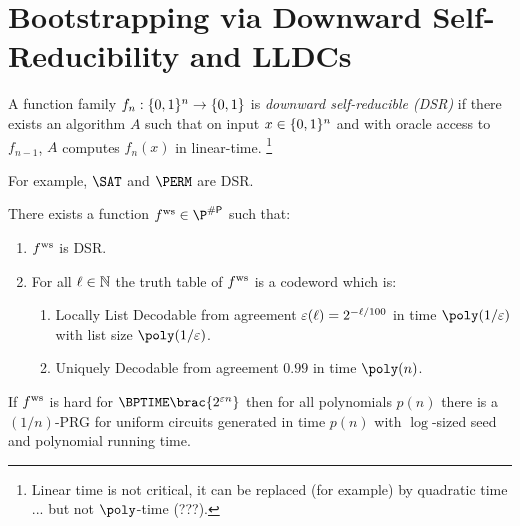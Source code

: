 \section{Bootstrapping via Downward Self-Reducibility and LLDCs}

\begin{definition}
  A function family $f_n : \{0, 1\}^n \to \{0, 1\}$ is \emph{downward self-reducible (DSR)} if there exists an algorithm $A$
  such that on input $x \in \{0, 1\}^n$ and with oracle access to $f_{n-1}$, $A$ computes $f_n(x)$ in linear-time.
  \footnote{Linear time is not critical, it can be replaced (for example) by quadratic time ... but not $\poly$-time
  (???).}
\end{definition}

For example, $\SAT$ and $\PERM$ are DSR.


\begin{proposition}
  There exists a function $\fws \in \P^{\sharpp}$ such that:
  \begin{enumerate}
    \item $ f^{\text{ws}} $ is DSR.
    \item For all $\ell \in \mathbb{N}$ the truth table of $ f^{\text{ws}} $ is a codeword
      which is:
      \begin{enumerate}
        \item Locally List Decodable from agreement $\varepsilon(\ell) = 2^{-\ell /
          100}$ in time $\poly(1/\eps)$ with list size $\poly(1 / \eps)$.
        \item Uniquely Decodable from agreement $0.99$ in time $\poly(n)$.
      \end{enumerate}
  \end{enumerate}
\end{proposition}

\begin{theorem}\label{thm:uniform-hard-random-sharpP}
  If $ f^{\text{ws}} $ is hard for $\BPTIME\brac{2^{\eps n}}$ then for all polynomials
  $p(n)$ there is a $(1 / n)$-PRG for uniform circuits generated in time $p(n)$
  with $\log$-sized seed and polynomial running time.
\end{theorem}

